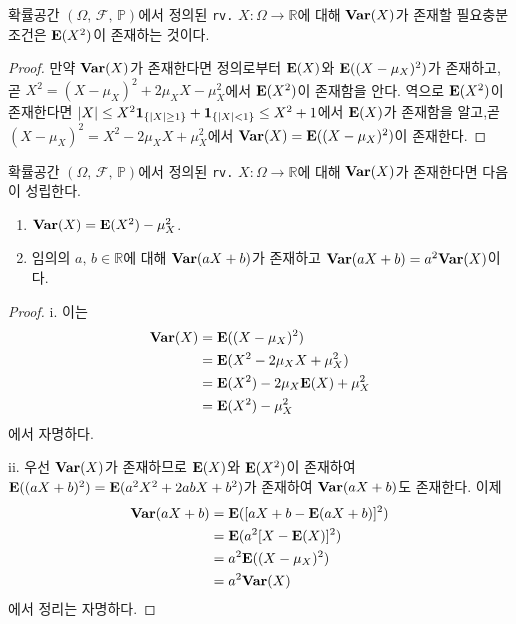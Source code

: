 \begin{proposition}
    확률공간 $(\Omega,\,\mathcal{F},\,\mathbb{P})$에서 정의된 \texttt{rv.} $X:\Omega\to\mathbb{R}$에 대해 $\mathbf{Var}(X)$가 존재할 필요충분조건은 $\mathbf{E}(X^2)$이 존재하는 것이다.
\end{proposition}

\begin{proof}
    만약 $\mathbf{Var}(X)$가 존재한다면 정의로부터 $\mathbf{E}(X)$와 $\mathbf{E}((X-\mu_X)^2)$가 존재하고, 곧 $X^2=(X-\mu_X)^2+2\mu_XX-\mu_X^2$에서 $\mathbf{E}(X^2)$이 존재함을 안다. 역으로 $\mathbf{E}(X^2)$이 존재한다면 $|X|\leq X^2\mathbf{1}_{\{|X|\geq1\}}+\mathbf{1}_{\{|X|<1\}}\leq X^2+1$에서 $\mathbf{E}(X)$가 존재함을 알고,곧 $(X-\mu_X)^2=X^2-2\mu_XX+\mu_X^2$에서 $\mathbf{Var}(X)=\mathbf{E}((X-\mu_X)^2)$이 존재한다.
\end{proof}

\begin{theorem}
    확률공간 $(\Omega,\,\mathcal{F},\,\mathbb{P})$에서 정의된 \texttt{rv.} $X:\Omega\to\mathbb{R}$에 대해 $\mathbf{Var}(X)$가 존재한다면 다음이 성립한다.
    \begin{enumerate}
        \item $\mathbf{Var}(X)=\mathbf{E}(X^2)-\mu_X^2$.
        \item 임의의 $a,\,b\in\mathbb{R}$에 대해 $\mathbf{Var}(aX+b)$가 존재하고 $\mathbf{Var}(aX+b)=a^2\mathbf{Var}(X)$이다.
    \end{enumerate}
\end{theorem}

\begin{proof}
    i. 이는
    \begin{align*}
        \mathbf{Var}(X)&=\mathbf{E}((X-\mu_X)^2)\\
        &=\mathbf{E}(X^2-2\mu_XX+\mu_X^2)\\
        &=\mathbf{E}(X^2)-2\mu_X\mathbf{E}(X)+\mu_X^2\\
        &=\mathbf{E}(X^2)-\mu_X^2
    \end{align*}
    에서 자명하다.

    ii. 우선 $\mathbf{Var}(X)$가 존재하므로 $\mathbf{E}(X)$와 $\mathbf{E}(X^2)$이 존재하여 $\mathbf{E}((aX+b)^2)=\mathbf{E}(a^2X^2+2abX+b^2)$가 존재하여 $\mathbf{Var}(aX+b)$도 존재한다. 이제
    \begin{align*}
        \mathbf{Var}(aX+b)&=\mathbf{E}([aX+b-\mathbf{E}(aX+b)]^2)\\
        &=\mathbf{E}(a^2[X-\mathbf{E}(X)]^2)\\
        &=a^2\mathbf{E}((X-\mu_X)^2)\\
        &=a^2\mathbf{Var}(X)
    \end{align*}
   에서 정리는 자명하다.
\end{proof}

